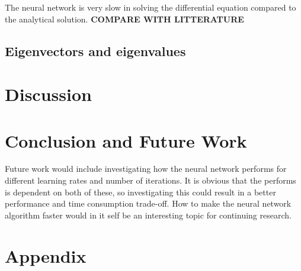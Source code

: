 \documentclass[a4paper,11pt,twocolumn]{article}
\begin{document}
The neural network is very slow in solving the differential equation compared to the analytical solution. \textbf{COMPARE WITH LITTERATURE}

\subsection{Eigenvectors and eigenvalues}


\section{Discussion}


\section{Conclusion and Future Work}

Future work would include investigating how the neural network performs for different learning rates and number of iterations. It is obvious that the performs is dependent on both of these, so investigating this could result in a better performance and time consumption trade-off. How to make the neural network algorithm faster would in it self be an interesting topic for continuing research. 

\section{Appendix}

\end{document}

